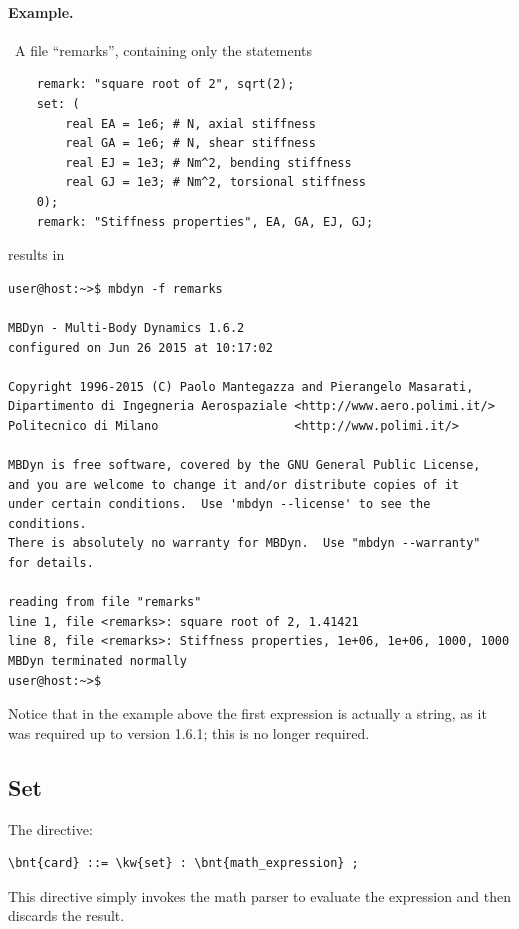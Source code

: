\paragraph{Example.} \
A file ``remarks'', containing only the statements
\begin{verbatim}
    remark: "square root of 2", sqrt(2);
    set: (
        real EA = 1e6; # N, axial stiffness
        real GA = 1e6; # N, shear stiffness
        real EJ = 1e3; # Nm^2, bending stiffness
        real GJ = 1e3; # Nm^2, torsional stiffness
    0);
    remark: "Stiffness properties", EA, GA, EJ, GJ;
\end{verbatim}
results in
\begin{verbatim}
user@host:~>$ mbdyn -f remarks

MBDyn - Multi-Body Dynamics 1.6.2
configured on Jun 26 2015 at 10:17:02

Copyright 1996-2015 (C) Paolo Mantegazza and Pierangelo Masarati,
Dipartimento di Ingegneria Aerospaziale <http://www.aero.polimi.it/>
Politecnico di Milano                   <http://www.polimi.it/>

MBDyn is free software, covered by the GNU General Public License,
and you are welcome to change it and/or distribute copies of it
under certain conditions.  Use 'mbdyn --license' to see the conditions.
There is absolutely no warranty for MBDyn.  Use "mbdyn --warranty"
for details.

reading from file "remarks"
line 1, file <remarks>: square root of 2, 1.41421
line 8, file <remarks>: Stiffness properties, 1e+06, 1e+06, 1000, 1000
MBDyn terminated normally
user@host:~>$
\end{verbatim}
Notice that in the example above the first expression is actually a string,
as it was required up to version 1.6.1; this is no longer required.

\subsection{Set}
The  directive:
\begin{Verbatim}[commandchars=\\\{\}]
    \bnt{card} ::= \kw{set} : \bnt{math_expression} ;
\end{Verbatim}
This directive simply invokes the math parser to evaluate the expression
\nt{math\_expression} and then discards the result.

